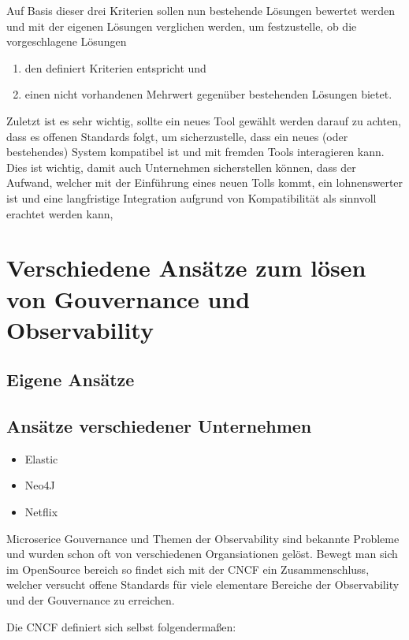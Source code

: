\documentclass[
	12pt,
	BCOR=5mm,
	DIV=12,
	headinclude=on,
	footinclude=off,
	parskip=half,
	bibliography=totoc,
	listof=entryprefix,
	toc=listof,
	numbers=noenddot,
	plainfootsepline
]{scrreprt}
\begin{document}
Auf Basis dieser drei Kriterien sollen nun bestehende Lösungen bewertet werden und mit der eigenen Lösungen verglichen werden, um festzustelle, ob die vorgeschlagene Lösungen
\begin{enumerate}
	\item den definiert Kriterien entspricht und
	\item einen nicht vorhandenen Mehrwert gegenüber bestehenden Lösungen bietet.
\end{enumerate}

Zuletzt ist es sehr wichtig, sollte ein neues Tool gewählt werden darauf zu achten, dass es offenen Standards folgt, um sicherzustelle, dass ein neues (oder bestehendes) System kompatibel ist und mit fremden Tools interagieren kann. Dies ist wichtig, damit auch Unternehmen sicherstellen können, dass der Aufwand, welcher mit der Einführung eines neuen Tolls kommt, ein lohnenswerter ist und eine langfristige Integration aufgrund von Kompatibilität als sinnvoll erachtet werden kann,

\section{Verschiedene Ansätze zum lösen von Gouvernance und Observability}
\subsection{Eigene Ansätze}
\subsection{Ansätze verschiedener Unternehmen}
\begin{itemize}
	\item Elastic 
	\item Neo4J 
	\item Netflix 
\end{itemize}
Microserice Gouvernance und Themen der Observability sind bekannte Probleme und wurden schon oft von verschiedenen Organsiationen gelöst. Bewegt man sich im OpenSource bereich so findet sich mit der \ac{CNCF} ein Zusammenschluss, welcher versucht offene Standards für viele elementare Bereiche der Observability und der Gouvernance zu erreichen.

Die \ac{CNCF} definiert sich selbst folgendermaßen:
\end{document}
